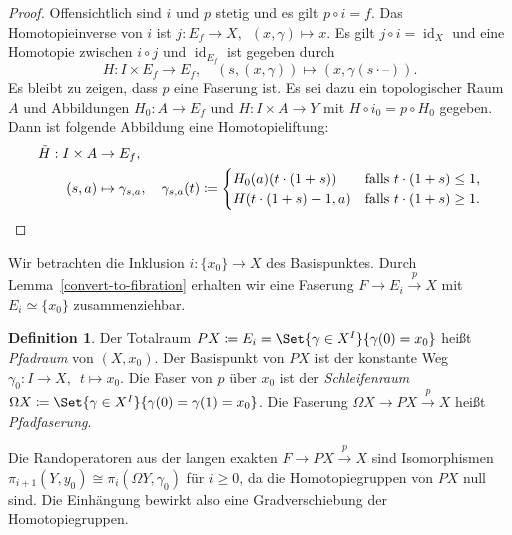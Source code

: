 \documentclass[11pt, a4paper, german]{article}
\theoremstyle{definition}
\newtheorem{defn}[lem]{Definition}
\theoremstyle{remark}
\newtheorem*{bem}{Bemerkung}
\DeclareMathOperator{\Hom}{Hom} %
\DeclareMathOperator{\id}{id} %
\newcommand{\blank}{\text{--}} %
\newcommand{\I}{I} %
\begin{document}
\begin{proof}
  Offensichtlich sind $i$ und $p$ stetig und es gilt $p \circ i = f$.
  Das Homotopieinverse von $i$ ist $j : E_f \to X, \enspace (x, \gamma) \mapsto x$.
  Es gilt $j \circ i = \id_X$ und eine Homotopie zwischen $i \circ j$ und $\id_{E_f}$ ist gegeben durch
  \[
    H : \I \times E_f \to E_f, \quad
    (s, (x, \gamma)) \mapsto (x, \gamma(s \cdot \blank)).
  \]
  Es bleibt zu zeigen, dass $p$ eine Faserung ist.
  Es sei dazu ein topologischer Raum $A$ und Abbildungen $H_0 : A \to E_f$ und $H : \I \times A \to Y$ mit $H \circ i_0 = p \circ H_0$ gegeben.
  Dann ist folgende Abbildung eine Homotopieliftung:
  \begin{align*}
    \tilde{H} : \I \times A & \to E_f, \\
    (s, a) & \mapsto \gamma_{s, a}, \quad
    \gamma_{s, a}(t) \coloneqq \begin{cases}
      H_0(a)(t \cdot (1+s)) & \text{falls $t \cdot (1+s) \leq 1$,} \\
      H(t \cdot (1+s) - 1, a) & \text{falls $t \cdot (1+s) \geq 1$.}
      \qedhere
    \end{cases}
  \end{align*}
\end{proof}

Wir betrachten die Inklusion $i : \{ x_0 \} \to X$ des Basispunktes.
Durch Lemma~\ref{convert-to-fibration} erhalten wir eine Faserung $F \to E_i \xrightarrow{p} X$ mit $E_i \simeq \{ x_0 \}$ zusammenziehbar.

\begin{defn}
  Der Totalraum $PX \coloneqq E_i = \Set{\gamma \in X^\I}{\gamma(0) = x_0}$ heißt \emph{Pfadraum} von $(X, x_0)$.
  Der Basispunkt von $PX$ ist der konstante Weg $\gamma_0 : \I \to X, \enspace t \mapsto x_0$.
  Die Faser von $p$ über $x_0$ ist der \emph{Schleifenraum}
  $\Omega X \coloneqq \Set{\gamma \in X^\I}{\gamma(0) = \gamma(1) = x_0}$.
  Die Faserung $\Omega X \to PX \xrightarrow{p} X$ heißt \emph{Pfadfaserung}.
\end{defn}

Die Randoperatoren aus der langen exakten $F \to PX \xrightarrow{p} X$ sind Isomorphismen $\pi_{i+1}(Y, y_0) \cong \pi_i(\Omega Y, \gamma_0)$ für $i \geq 0$, da die Homotopiegruppen von $PX$ null sind.
Die Einhängung bewirkt also eine Gradverschiebung der Homotopiegruppen.

\end{document}
